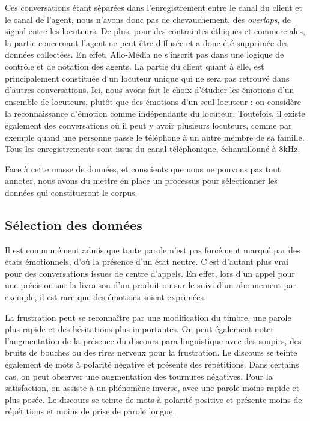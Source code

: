 Ces conversations étant séparées dans l'enregistrement entre le canal du client et le canal de l'agent, nous n'avons donc pas de chevauchement, des \textit{overlaps}, de signal entre les locuteurs. De plus, pour des contraintes éthiques et commerciales, la partie concernant l'agent ne peut être diffusée et a donc été supprimée des données collectées. En effet, Allo-Média ne s'inscrit pas dans une logique de contrôle et de notation des agents. La partie du client quant à elle, est principalement constituée d'un locuteur unique qui ne sera pas retrouvé dans d'autres conversations. Ici, nous avons fait le choix d'étudier les émotions d'un ensemble de locuteurs, plutôt que des émotions d'un seul locuteur : on considère la reconnaissance d'émotion comme indépendante du locuteur. Toutefois, il existe également des conversations où il peut y avoir plusieurs locuteurs, comme par exemple quand une personne passe le téléphone à un autre membre de sa famille. Tous les enregistrements sont issus du canal téléphonique, échantillonné à 8kHz.

Face à cette masse de données, et conscients que nous ne pouvons pas tout annoter, nous avons du mettre en place un processus pour sélectionner les données qui constitueront le corpus.

\subsection{Sélection des données}
Il est communément admis que toute parole n'est pas forcément marqué par des états émotionnels, d'où la présence d'un état neutre. C'est d'autant plus vrai pour des conversations issues de centre d'appels. En effet, lors d'un appel pour une précision sur la livraison d'un produit ou sur le suivi d'un abonnement par exemple, il est rare que des émotions soient exprimées.

La frustration peut se reconnaître par une modification du timbre, une parole plus rapide et des hésitations plus importantes. On peut également noter l'augmentation de la présence du discours para-linguistique avec des soupirs, des bruits de bouches ou des rires nerveux pour la frustration. Le discours se teinte également de mots à polarité négative et présente des répétitions. Dans certains cas, on peut observer une augmentation des tournures négatives. Pour la satisfaction, on assiste à un phénomène inverse, avec une parole moins rapide et plus posée. Le discours se teinte de mots à polarité positive et présente moins de répétitions et moins de prise de parole longue.

